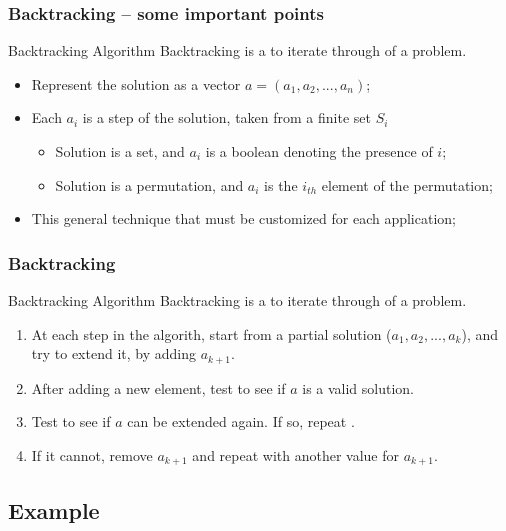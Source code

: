\documentclass{beamer}
\begin{document}
\begin{frame}
  \frametitle{Backtracking -- some important points}
  \begin{block}{Backtracking Algorithm}
    Backtracking is a  to iterate through
     of a problem.
  \end{block}
  \bigskip

  \begin{itemize}
  \item Represent the solution as a vector $a = (a_1, a_2, ..., a_n)$;
  \item Each $a_i$ is a step of the solution, taken from a finite set $S_i$\\
    \begin{itemize}
    \item Solution is a set, and $a_i$ is a boolean denoting the presence of $i$;
    \item Solution is a permutation, and $a_i$ is the $i_{th}$ element of the permutation;
    \end{itemize}
  \item This general technique that must be customized for each application;
  \end{itemize}
  \vfill
\end{frame}

\begin{frame}
  \frametitle{Backtracking}
  \begin{block}{Backtracking Algorithm}
    Backtracking is a  to iterate through
     of a problem.
  \end{block}
  \begin{enumerate}
  \item At each step in the algorith, start from a partial solution
    ($a_1, a_2, ..., a_k$), and try to extend it, by adding $a_{k+1}$.
  \item After adding a new element, test to see if $a$ is a valid solution.
  \item Test to see if $a$ can be extended again. If so, repeat .
  \item If it cannot, remove $a_{k+1}$ and repeat  with
    another value for $a_{k+1}$.
  \end{enumerate}
  \vfill
\end{frame}

\subsection{Example}
\end{document}
